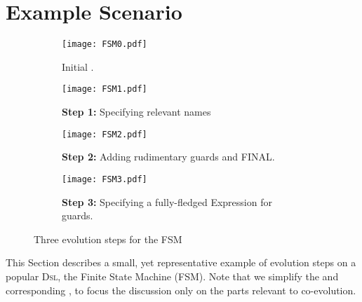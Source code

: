 \section{Example Scenario}
\label{sec:Example}

\begin{figure*}
    \centering
    \begin{subfigure}[b]{0.45\textwidth}
			\centering
      \texttt{[image: FSM0.pdf]}
      \caption{Initial \metamodel.}
      \label{fig:FSM:Init}
    \end{subfigure}
    \hfill
    \begin{subfigure}[b]{0.45\textwidth}
			\centering
      \texttt{[image: FSM1.pdf]}
      \caption{\textbf{Step 1:} Specifying relevant \textsf{name}s}
      \label{fig:FSM:Relevant}
    \end{subfigure}
    \hfill
    \begin{subfigure}[b]{0.45\textwidth}
			\centering
      \texttt{[image: FSM2.pdf]}
      \caption{\textbf{Step 2:} Adding rudimentary guards and \textsf{FINAL}.}
      \label{fig:FSM:Guard}
    \end{subfigure}
    \hfill 
		\begin{subfigure}[b]{0.45\textwidth}
			\centering
      \texttt{[image: FSM3.pdf]}
      \caption{\textbf{Step 3:} Specifying a fully-fledged \textsf{Expression} for \textsf{guard}s.}
      \label{fig:FSM:Expression}
    \end{subfigure}
    \caption{Three evolution steps for the \textsf{FSM} \metamodel}
    \label{fig:FSM}
\end{figure*}

This Section describes a small, yet representative example of \metamodel
evolution steps on a popular \textsc{Dsl}, the Finite State Machine (\textsf{FSM}).
Note that we simplify the \metamodels and corresponding \viewtypes, to focus 
the discussion only on the parts relevant to co-evolution. 

